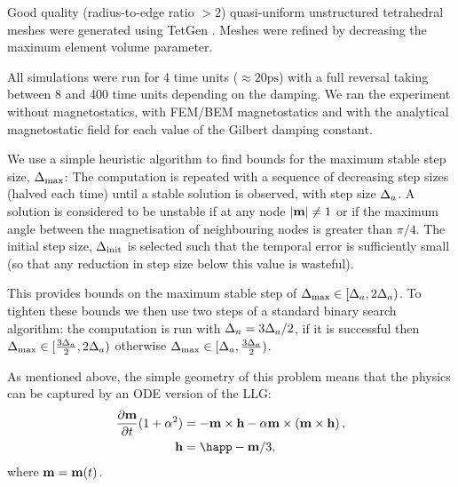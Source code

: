 \documentclass[10pt, final, conference, transmag]{IEEEtran}
\begin{document}
Good quality (radius-to-edge ratio $ > 2$) quasi-uniform unstructured tetrahedral meshes were generated using TetGen \cite{tetgen-website}. Meshes were refined by decreasing the maximum element volume parameter.

All simulations were run for 4 time units ($\approx 20\text{ps}$) with a full reversal taking between 8 and 400 time units depending on the damping.
We ran the experiment without magnetostatics, with FEM/BEM magnetostatics and with the analytical magnetostatic field for each value of the Gilbert damping constant.

We use a simple heuristic algorithm to find bounds for the maximum stable step size, $\Delta_{\text{max}}$: The computation is repeated with a sequence of decreasing step sizes (halved each time) until a stable solution is observed, with step size $\Delta_{a}$. A solution is considered to be unstable if at any node $|\mathbf{m}| \neq 1$ or if the maximum angle between the magnetisation of neighbouring nodes is greater than $\pi/4$. The initial step size, $\Delta_{\text{init}}$ is selected such that the temporal error is sufficiently small (so that any reduction in step size below this value is wasteful).

This provides bounds on the maximum stable step of $\Delta_{\text{max}} \in [\Delta_{a}, 2\Delta_{a})$. To tighten these bounds we then use two steps of a standard binary search algorithm: the computation is run with $\Delta_{n}{} = 3\Delta_{a}/2$, if it is successful then $\Delta_{\text{max}} \in [\frac{3\Delta_{a}}{2}, 2\Delta_{a})$ otherwise $\Delta_{\text{max}} \in [\Delta_{a}, \frac{3\Delta_{a}}{2})$.


As mentioned above, the simple geometry of this problem means that the physics can be captured by an ODE version of the LLG:
\begin{equation}
  \label{eq:ode-llg}
  \begin{aligned}
    \dmdt (1 + \dampc^2) &= - \mv \times \hv - \dampc \mv \times \left( \mv \times \hv \right), \\
    \hv &= \happ - \mv/3,
  \end{aligned}
\end{equation}
where $\mathbf{m} = \mathbf{m}(t)$.
\end{document}
